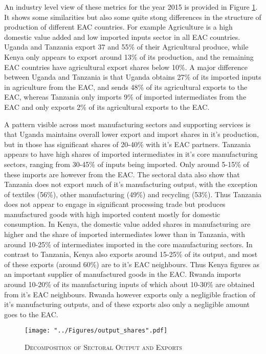 \documentclass[a4paper]{article}
\begin{document}
An industry level view of these metrics for the year 2015 is provided in Figure \ref{fig:outshares}. It shows some similarities but also some quite stong differences in the structure of production of different EAC countries. For example Agriculture is a high domestic value added and low imported inputs sector in all EAC countries. Uganda and Tanzania export 37 and 55\% of their Agricultural produce, while Kenya only appears to export around 13\% of its production, and the remaining EAC countries have agricultural export shares below 10\%. A major difference between Uganda and Tanzania is that Uganda obtains 27\% of its imported inputs in agriculture from the EAC, and sends 48\% of its agricultural exports to the EAC, whereas Tanzania only imports 9\% of imported intermediates from the EAC and only exports 2\% of its agricultural exports to the EAC. \newline

A pattern visible across most manufacturing sectors and supporting services is that Uganda maintains overall lower export and import shares in it's production, but in those has significant shares of 20-40\% with it's EAC partners. Tanzania appears to have high shares of imported intermediates in it's core manufacturing sectors, ranging from 30-45\% of inputs being imported. Only around 5-15\% of these imports are however from the EAC. The sectoral data also show that Tanzania does not export much of it's manufacturing output, with the exception of textiles (56\%), other manufacturing (49\%) and recycling (53\%). Thus Tanzania does not appear to engage in significant processing trade but produces manufactured goods with high imported content mostly for domestic consumption. In Kenya, the domestic value added shares in manufacturing are higher and the share of imported intermediates lower than in Tanzania, with around 10-25\% of intermediates imported in the core manufacturing sectors. In contrast to Tanzania, Kenya also exports around 15-25\% of its output, and most of these exports (around 60\%) are to it's EAC neighbours. Thus Kenya figures as an important supplier of manufactured goods in the EAC. Rwanda imports around 10-20\% of its manufacturing inputs of which about 10-30\% are obtained from it's EAC neighbours. Rwanda however exports only a negligible fraction of it's manufacturing outputs, and of these exports also only a negligible amount goes to the EAC. \newline



\begin{figure}[!h]
\centering
\vspace{-2cm}
\caption{\label{fig:outshares}\textsc{Decomposition of Sectoral Output and Exports}}
\vspace*{\fill}
\begin{adjustbox}{center}
\texttt{[image: "../Figures/output\_shares".pdf]} %
\end{adjustbox}
\vspace*{\fill}
\end{figure}
\FloatBarrier
\end{document}
